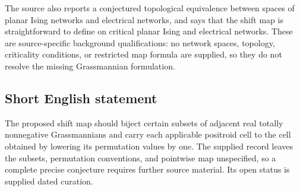 \documentclass[11pt]{article}
\begin{document}
The source also reports a conjectured topological equivalence between spaces of planar Ising networks and electrical networks, and says that the shift map is straightforward to define on critical planar Ising and electrical networks. These are source-specific background qualifications: no network spaces, topology, criticality conditions, or restricted map formula are supplied, so they do not resolve the missing Grassmannian formulation.
\subsection{Short English statement}
The proposed shift map should biject certain subsets of adjacent real totally nonnegative Grassmannians and carry each applicable positroid cell to the cell obtained by lowering its permutation values by one. The supplied record leaves the subsets, permutation conventions, and pointwise map unspecified, so a complete precise conjecture requires further source material. Its open status is supplied dated curation.
\end{document}
